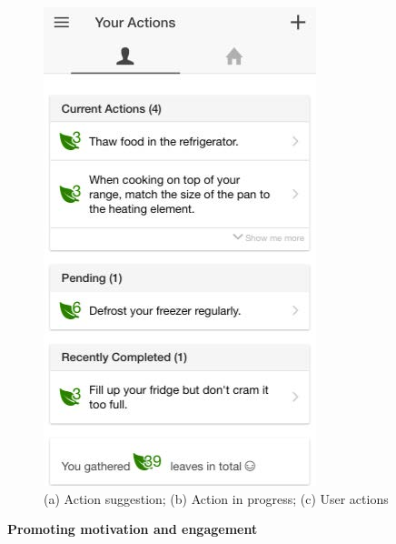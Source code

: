 \begin{figure}[b!]
\begin{center}
\begin{minipage}[t!]{0.33\linewidth}
         \includegraphics[width=1\linewidth]{img/action_tab.jpg}    
        \end{minipage}
      \end{center}
      \caption{(a) Action suggestion; (b) Action in progress; (c) User actions}\label{fig:actions}
\end{figure}


\textbf{Promoting motivation and engagement}

